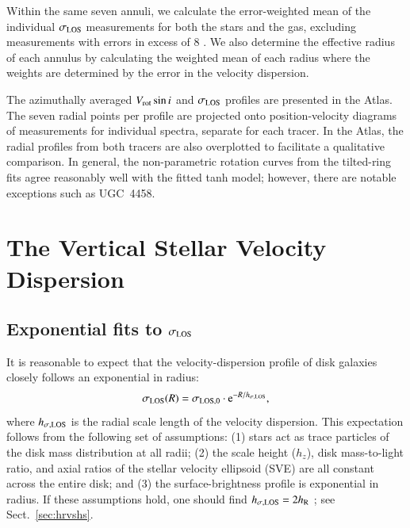 \documentclass[traditabstract]{aa} %
\begin{document}
Within the same seven annuli, we calculate the error-weighted mean of the
individual $\sigma_{\rm LOS}$ measurements for both the stars and the gas, excluding
measurements with errors in excess of 8 \kms.  We also determine the effective
radius of each annulus by calculating the weighted mean of each radius where the
weights are determined by the error in the velocity dispersion.

The azimuthally averaged $V_{\rm rot} \sin i$ and $\sigma_{\rm LOS}$ profiles are presented in
the Atlas.  The seven radial points per profile are projected onto
position-velocity diagrams of measurements for individual spectra, separate for
each tracer.  In the Atlas, the radial profiles from both tracers are also
overplotted to facilitate a qualitative comparison.   In general, the
non-parametric rotation curves from the tilted-ring fits agree reasonably well
with the fitted tanh model; however, there are notable exceptions such as
UGC~4458.


\section{The Vertical Stellar Velocity Dispersion}
\label{sec:sigmaz}

\subsection{Exponential fits to $\sigma_{\rm LOS}$}
\label{sec:expsigma}

It is reasonable to expect that the velocity-dispersion profile of disk galaxies
closely follows an exponential in radius:
%
\begin{equation}
%
\slos(R) = \sigma_{\rm LOS,0} \cdot {\rm e}^{-R/\hsl},
%
\label{eq:sigmaexp}
%
\end{equation}
%
where $h_{\sigma{\rm,LOS}}$ is the radial scale length of the velocity dispersion.  
This expectation follows from the following set of assumptions: (1) stars act as trace
particles of the disk mass distribution at all radii; (2) the scale height ($h_z$), disk
mass-to-light ratio, and axial ratios of the stellar velocity ellipsoid (SVE) are all
constant across the entire disk; and (3) the surface-brightness profile is
exponential in radius.  If these assumptions hold, one should find $h_{\sigma{\rm,LOS}} = 2h_{\rm R}$
\citep[e.g.][]{kruit1981}; see Sect.~\ref{sec:hrvshs}.
\end{document}
